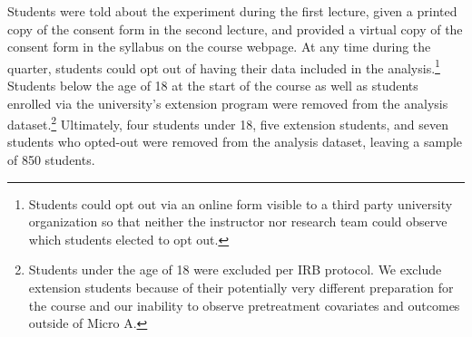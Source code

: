 \documentclass[12pt]{article}
\begin{document}


Students were told about the experiment during the first lecture, given a printed copy of the consent form in the second lecture, and provided a virtual copy of the consent form in the syllabus on the course webpage. At any time during the quarter, students could opt out of having their data included in the analysis.\footnote{Students could opt out via an online form visible to a third party university organization so that neither the instructor nor research team could observe which students elected to opt out.} Students below the age of 18 at the start of the course as well as students enrolled via the university's extension program were removed from the analysis dataset.\footnote{Students under the age of 18 were excluded per IRB protocol. We exclude extension students because of their potentially very different preparation for the course and our inability to observe pretreatment covariates and outcomes outside of Micro A.} Ultimately, four students under 18, five extension students, and seven students who opted-out were removed from the analysis dataset, leaving a sample of 850 students.
\end{document}
